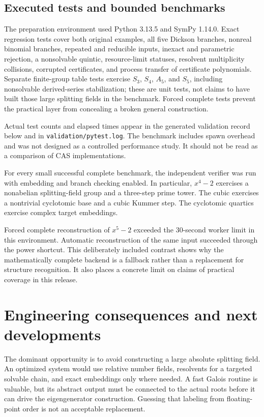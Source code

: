 \documentclass[11pt,letterpaper]{article}
\theoremstyle{definition}\newtheorem{definition}[theorem]{Definition}
\theoremstyle{remark}\newtheorem{remark}[theorem]{Remark}
\newcommand{\code}[1]{\texttt{#1}}
\begin{document}
\subsection{Executed tests and bounded benchmarks}
\label{sec:validation}
The preparation environment used Python 3.13.5 and SymPy 1.14.0. Exact
regression tests cover both original examples, all five Dickson branches,
nonreal binomial branches, repeated and reducible inputs, inexact and
parametric rejection, a nonsolvable quintic, resource-limit statuses,
resolvent multiplicity collisions, corrupted certificates, and process
transfer of certificate polynomials. Separate finite-group table tests
exercise $S_3$, $S_4$, $A_5$, and $S_5$, including nonsolvable derived-series
stabilization; these are unit tests, not claims to have built those large
splitting fields in the benchmark. Forced complete tests prevent the
practical layer from concealing a broken general construction.

Actual test counts and elapsed times appear in the generated validation
record below and in \code{validation/pytest.log}. The benchmark includes
spawn overhead and was not designed as a controlled performance study.
It should not be read as a comparison of CAS implementations.


For every small successful complete benchmark, the independent verifier
was run with embedding and branch checking enabled. In particular,
$x^4-2$ exercises a nonabelian splitting-field group and a three-step
prime tower. The cubic exercises a nontrivial cyclotomic base and a cubic
Kummer step. The cyclotomic quartics exercise complex target embeddings.

Forced complete reconstruction of $x^5-2$ exceeded the 30-second worker
limit in this environment. Automatic reconstruction of the same input
succeeded through the power shortcut. This deliberately included contrast
shows why the mathematically complete backend is a fallback rather than a
replacement for structure recognition. It also places a concrete limit on
claims of practical coverage in this release.

\section{Engineering consequences and next developments}
\label{sec:future}
The dominant opportunity is to avoid constructing a large absolute
splitting field. An optimized system would use relative number fields,
resolvents for a targeted solvable chain, and exact embeddings only where
needed. A fast Galois routine is valuable, but its abstract output must be
connected to the actual roots before it can drive the eigengenerator
construction. Guessing that labeling from floating-point order is not an
acceptable replacement.
\end{document}
